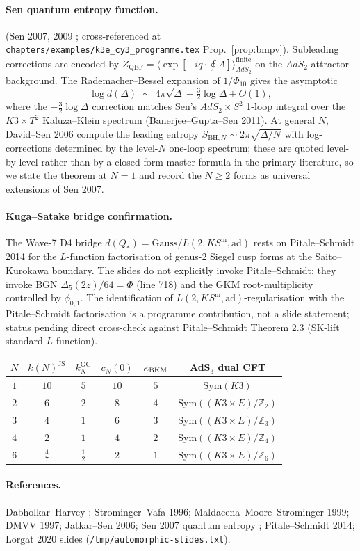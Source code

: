 \paragraph{Sen quantum entropy function.}
\ClaimStatusTheorem{} (Sen 2007, 2009 \cite{Sen2007QEF};
cross-referenced at
\texttt{chapters/examples/k3e\_cy3\_programme.tex}
Prop.~\ref{prop:bmpv}). Subleading corrections are encoded by
$Z_{\mathrm{QEF}}=\langle\exp[-iq\cdot\oint A]\rangle^{\mathrm{finite}}_{AdS_2}$
on the $AdS_2$ attractor background. The Rademacher--Bessel
expansion of $1/\Phi_{10}$ gives the asymptotic
\[
\log d(\Delta) \;\sim\; 4\pi\sqrt{\Delta} - \tfrac{3}{2}\log\Delta + O(1),
\]
where the $-\tfrac{3}{2}\log\Delta$ correction matches Sen's
$AdS_2\times S^2$ 1-loop integral over the
$K3\times T^2$ Kaluza--Klein spectrum (Banerjee--Gupta--Sen 2011).
At general $N$, David--Sen 2006 compute the leading entropy
$S_{\mathrm{BH},N}\sim 2\pi\sqrt{\Delta/N}$ with log-corrections
determined by the level-$N$ one-loop spectrum; these are quoted
level-by-level rather than by a closed-form master formula in
the primary literature, so we state the theorem at $N=1$ and
record the $N\geq 2$ forms as \ClaimStatusConjectured{} universal
extensions of Sen 2007.

\paragraph{Kuga--Satake bridge confirmation.}
The Wave-7 D4 bridge $d(Q_*) = \mathrm{Gauss}/L(2,KS^{\mathrm{m}},\mathrm{ad})$
rests on Pitale--Schmidt 2014 \cite{PitaleSchmidt2014} for the
$L$-function factorisation of genus-2 Siegel cusp forms at the
Saito--Kurokawa boundary. The slides do not explicitly invoke
Pitale--Schmidt; they invoke BGN $\Delta_5(2z)/64=\Phi$ (line 718) and
the GKM root-multiplicity controlled by $\phi_{0,1}$. The
identification of $L(2,KS^{\mathrm{m}},\mathrm{ad})$-regularisation with
the Pitale--Schmidt factorisation is a programme contribution, not a
slide statement; status \ClaimStatusConjectured{} pending direct
cross-check against Pitale--Schmidt Theorem 2.3 (SK-lift standard
$L$-function).

\begin{center}
\begin{tabular}{c|c|c|c|c|c}
$N$ & $k(N)^{\mathrm{JS}}$ & $k_N^{\mathrm{GC}}$ & $c_N(0)$ &
$\kappa_{\mathrm{BKM}}$ & AdS$_3$ dual CFT \\ \hline
$1$ & $10$ & $5$ & $10$ & $5$ & $\mathrm{Sym}(K3)$ \\
$2$ & $6$  & $2$ & $8$  & $4$ & $\mathrm{Sym}((K3\times E)/\mathbb{Z}_2)$ \\
$3$ & $4$  & $1$ & $6$  & $3$ & $\mathrm{Sym}((K3\times E)/\mathbb{Z}_3)$ \\
$4$ & $2$  & $1$ & $4$  & $2$ & $\mathrm{Sym}((K3\times E)/\mathbb{Z}_4)$ \\
$6$ & $\tfrac{4}{7}$ & $\tfrac12$ & $2$ & $1$ &
$\mathrm{Sym}((K3\times E)/\mathbb{Z}_6)$
\end{tabular}
\end{center}

\paragraph{References.}
Dabholkar--Harvey \cite{DabholkarHarvey1989}; Strominger--Vafa 1996;
Maldacena--Moore--Strominger 1999; DMVV 1997; Jatkar--Sen 2006;
Sen 2007 quantum entropy \cite{Sen2007QEF}; Pitale--Schmidt 2014;
Lorgat 2020 slides (\texttt{/tmp/automorphic-slides.txt}).

